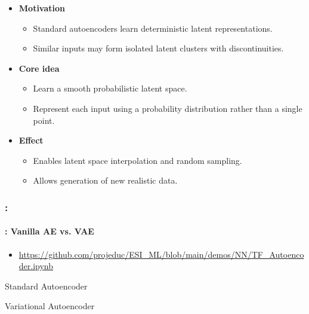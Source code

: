 \documentclass[xcolor=table]{beamer}
\begin{document}
	\begin{subsectionframe}
		\begin{itemize}
			
			\item \textbf{Motivation}
			\begin{itemize}
				\item Standard autoencoders learn deterministic latent representations.
				\item Similar inputs may form isolated latent clusters with discontinuities.
			\end{itemize}
			
			\item \textbf{Core idea}
			\begin{itemize}
				\item Learn a smooth probabilistic latent space.
				\item Represent each input using a probability distribution rather than a single point.
			\end{itemize}
			
			\item \textbf{Effect}
			\begin{itemize}
				\item Enables latent space interpolation and random sampling.
				\item Allows generation of new realistic data.
			\end{itemize}
			
		\end{itemize}
	\end{subsectionframe}
	
	
	\begin{frame}
		\frametitle{\insertshortsubtitle: \insertsection}
		\framesubtitle{\insertsubsection: Vanilla AE vs. VAE}
		
		\begin{itemize}
			\item {\scriptsize\url{https://github.com/projeduc/ESI_ML/blob/main/demos/NN/TF_Autoencoder.ipynb}}
		\end{itemize}
		
		\begin{minipage}{0.47\textwidth} 
			\begin{center}
				Standard Autoencoder
			\end{center}\vskip-6pt
		\end{minipage}
		\begin{minipage}{0.47\textwidth}
			\begin{center}
				Variational Autoencoder
			\end{center}\vskip-6pt
		\end{minipage}
		
	\end{frame}
	
\end{document}
